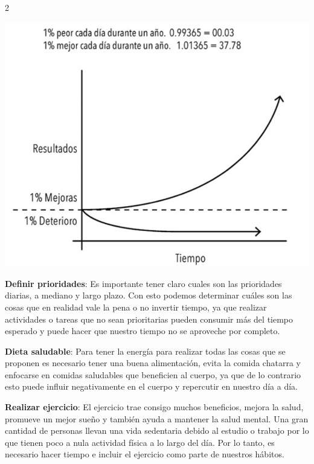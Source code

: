 \documentclass[12pt,spanish,Letterpaper,openany]{book}
\begin{document}
\begin {multicols}{2}
\begin {flushleft}
\noindent\begin{minipage}[c]{\columnwidth}
\centering

\includegraphics[width=1\linewidth]{images/pareja43_image2}

\end{minipage}
\end {flushleft}

\textbf{Definir prioridades}: Es importante tener claro cuales son las prioridades diarias, a mediano y largo plazo. Con esto podemos determinar cuáles son las cosas que en realidad vale la pena o no invertir tiempo, ya que realizar actividades o tareas que no sean prioritarias pueden consumir más del tiempo esperado y puede hacer que nuestro tiempo no se aproveche por completo.

\textbf{Dieta saludable}: Para tener la energía para realizar todas las cosas que se proponen es necesario tener una buena alimentación, evita la comida chatarra y enfocarse en comidas saludables que beneficien al cuerpo, ya que de lo contrario esto puede influir negativamente en el cuerpo y repercutir en nuestro día a día.

\textbf{Realizar ejercicio}: El ejercicio trae consigo muchos beneficios, mejora la salud, promueve un mejor sueño y también ayuda a mantener la salud mental. Una gran cantidad de personas llevan una vida sedentaria debido al estudio o trabajo por lo que tienen poco a nula actividad física a lo largo del día. Por lo tanto, es necesario hacer tiempo e incluir el ejercicio como parte de nuestros hábitos.


\end{multicols}
\end{document}
